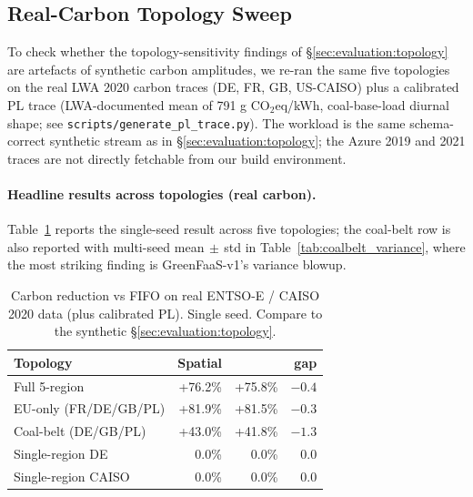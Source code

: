\subsection{Real-Carbon Topology Sweep}
\label{sec:evaluation:realtopology}

To check whether the topology-sensitivity findings of
\S\ref{sec:evaluation:topology} are artefacts of synthetic carbon
amplitudes, we re-ran the same five topologies on the real LWA 2020
carbon traces (DE, FR, GB, US-CAISO) plus a calibrated PL trace
(LWA-documented mean of 791 g CO$_2$eq/kWh, coal-base-load diurnal
shape; see \texttt{scripts/generate\_pl\_trace.py}). The workload is
the same schema-correct synthetic stream as in
\S\ref{sec:evaluation:topology}; the Azure 2019 and 2021 traces are
not directly fetchable from our build environment.

\paragraph{Headline results across topologies (real carbon).}
Table~\ref{tab:real_topology} reports the single-seed result across
five topologies; the coal-belt row is also reported with multi-seed
mean$\,\pm\,$std in Table~\ref{tab:coalbelt_variance}, where the most
striking finding is GreenFaaS-v1's variance blowup.

\begin{table}[h]
\centering\small
\caption{Carbon reduction vs FIFO on real ENTSO-E / CAISO 2020 data
(plus calibrated PL). Single seed. Compare to the synthetic
\S\ref{sec:evaluation:topology}.}
\label{tab:real_topology}
\begin{tabular}{lrrr}
\toprule
Topology               & Spatial   & \GreenFaaS{} & gap \\
\midrule
Full 5-region          & +76.2\%  & +75.8\%  & $-0.4$ \\
EU-only (FR/DE/GB/PL)  & +81.9\%  & +81.5\%  & $-0.3$ \\
Coal-belt (DE/GB/PL)   & +43.0\%  & +41.8\%  & $-1.3$ \\
Single-region DE       &   0.0\%   &   0.0\%   &   0.0 \\
Single-region CAISO    &   0.0\%   &   0.0\%   &   0.0 \\
\bottomrule
\end{tabular}
\end{table}

